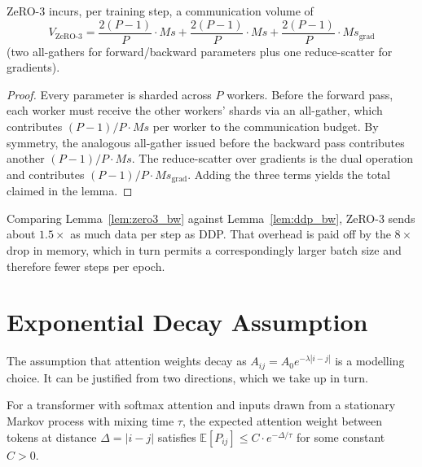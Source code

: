 \begin{lemma}\label{lem:zero3_bw}
ZeRO-3 incurs, per training step, a communication volume of
\begin{equation}
    V_{\text{ZeRO-3}} = \frac{2 (P - 1)}{P} \cdot M s
                     + \frac{2 (P - 1)}{P} \cdot M s
                     + \frac{2 (P - 1)}{P} \cdot M s_{\text{grad}}
\end{equation}
(two all-gathers for forward/backward parameters plus one reduce-scatter
for gradients).
\end{lemma}

\begin{proof}
Every parameter is sharded across $P$ workers. Before the
forward pass, each worker must receive the other workers' shards
via an all-gather, which contributes $(P-1)/P \cdot M s$ per
worker to the communication budget. By symmetry, the analogous
all-gather issued before the backward pass contributes another
$(P-1)/P \cdot M s$. The reduce-scatter over gradients is the
dual operation and contributes
$(P-1)/P \cdot M s_{\text{grad}}$. Adding the three terms yields
the total claimed in the lemma.
\end{proof}

\begin{remark}
Comparing Lemma~\ref{lem:zero3_bw} against Lemma~\ref{lem:ddp_bw},
ZeRO-3 sends about $1.5\times$ as much data per step as DDP.
That overhead is paid off by the $8\times$ drop in memory, which
in turn permits a correspondingly larger batch size and therefore
fewer steps per epoch.
\end{remark}

\section{Exponential Decay Assumption}\label{app:proof_decay}

The assumption that attention weights decay as
$A_{ij} = A_0 e^{-\lambda |i - j|}$ is a modelling choice. It can
be justified from two directions, which we take up in turn.

\begin{proposition}\label{prop:decay}
For a transformer with softmax attention and inputs drawn from a
stationary Markov process with mixing time $\tau$, the expected
attention weight between tokens at distance $\Delta = |i - j|$
satisfies
$\mathbb{E}[P_{ij}] \le C \cdot e^{-\Delta / \tau}$ for some constant
$C > 0$.
\end{proposition}

